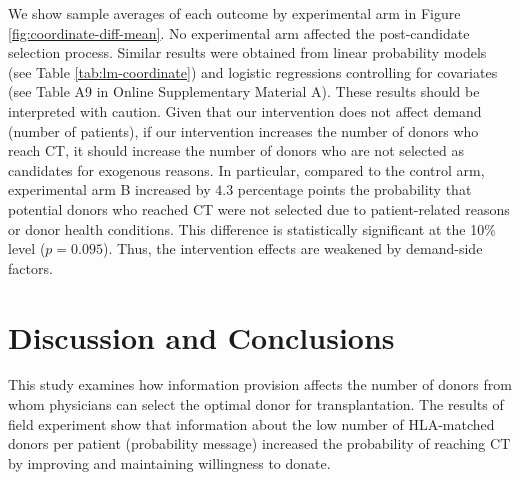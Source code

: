 \documentclass[12pt, a4paper]{article}
\begin{document}
We show sample averages of each outcome by experimental arm in Figure \ref{fig:coordinate-diff-mean}. No experimental arm affected the post-candidate selection process. Similar results were obtained from linear probability models (see Table \ref{tab:lm-coordinate}) and logistic regressions controlling for covariates (see Table A9 in Online Supplementary Material A). These results should be interpreted with caution. Given that our intervention does not affect demand (number of patients), if our intervention increases the number of donors who reach CT, it should increase the number of donors who are not selected as candidates for exogenous reasons. In particular, compared to the control arm, experimental arm B increased by \(4.3\) percentage points the probability that potential donors who reached CT were not selected due to patient-related reasons or donor health conditions. This difference is statistically significant at the 10\% level (\(p = 0.095\)). Thus, the intervention effects are weakened by demand-side factors.

\hypertarget{conclusion}{%
\section{Discussion and Conclusions}\label{conclusion}}

This study examines how information provision affects the number of donors from whom physicians can select the optimal donor for transplantation. The results of field experiment show that information about the low number of HLA-matched donors per patient (probability message) increased the probability of reaching CT by improving and maintaining willingness to donate.
\end{document}
